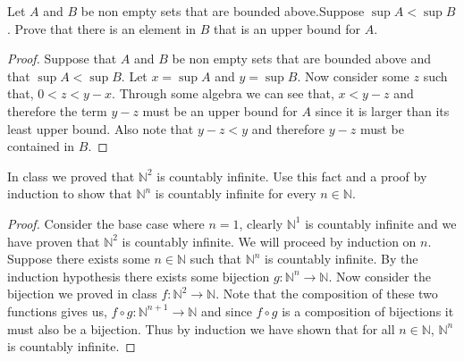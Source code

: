 \documentclass[12pt]{article}
\makeatletter
\theoremstyle{homework}
\newenvironment{exercise}[1]
{\def\@currentlabel{#1}\exercisecore}
{\endexercisecore}
\newcommand{\Nats}{\ensuremath{\mathbb N}}
\makeatother
\begin{document}
\begin{exercise}{1}Let $A$ and $B$ be non empty sets that are bounded above.Suppose $\sup A < \sup B$. Prove that there is an element in $B$ that is an
	upper bound for $A$.\\

	\begin{proof}
		Suppose that $A$ and $B$ be non empty sets that are bounded above and that $\sup A < \sup B$. Let $x = \sup A$ and $y = \sup B$. Now consider some $z$
		such that, $0 < z < y-x$. Through some algebra we can see that, $x < y - z$  and therefore the term $y - z$ must be an upper bound for $A$ since it is larger than its least upper bound. Also 
		note that $y - z < y$ and therefore $y-z$ must be contained in $B$.
	\end{proof}

\end{exercise}


\begin{exercise}{2} In class we proved that $\Nats^2$ is countably infinite. Use this fact and a proof by induction to show that $\Nats^n$ is countably infinite for every $n \in \Nats$. \\

  \begin{proof}
    Consider the base case where $n = 1$, clearly $\Nats^1$ is countably infinite and we have proven that $\Nats^2$ is countably infinite. We will proceed by induction on $n$. 
    Suppose there exists some $n\in \Nats$ such that $\Nats^n$ is countably infinite. By the induction hypothesis there exists some bijection 
     $g: \Nats^n \to \Nats$. Now consider the bijection we proved in class $f: \Nats^2 \to \Nats$. Note that the composition of these two functions gives us, 
     $f\circ g: \Nats^{n+1} \to \Nats $ and since $f\circ g$ is a composition of bijections it must also be a bijection. Thus by induction we have shown that for all $n\in \Nats$,
     $\Nats^n$ is countably infinite.     
  \end{proof}
  
\end{exercise}
\vspace{.5in}
\end{document}
